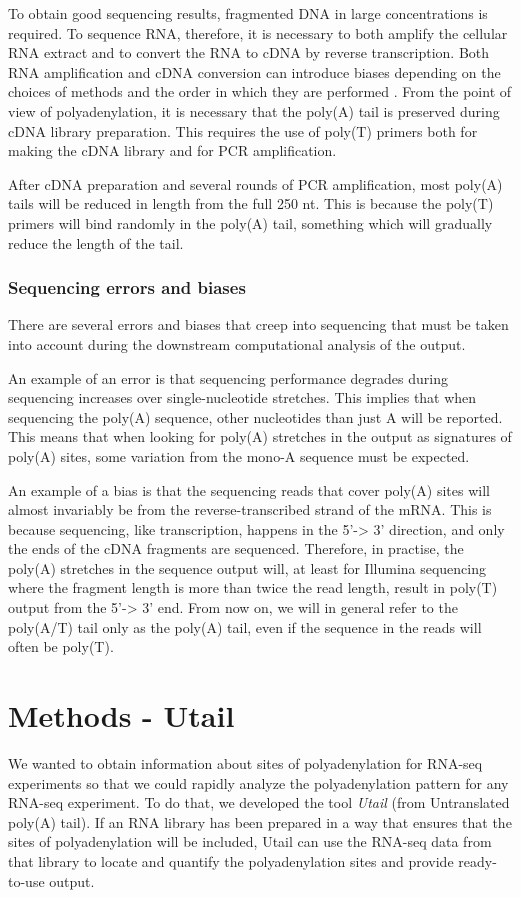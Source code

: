 To obtain good sequencing results, fragmented DNA in large concentrations is
required. To sequence RNA, therefore, it is necessary to both amplify the
cellular RNA extract and to convert the RNA to cDNA by reverse transcription.
Both RNA amplification and cDNA conversion can introduce biases depending on
the choices of methods and the order in which they are performed
\cite{wang_rna-seq:_2009}. From the point of view of polyadenylation, it is
necessary that the poly(A) tail is preserved during cDNA library preparation.
This requires the use of poly(T) primers both for making the cDNA library and
for PCR amplification.

After cDNA preparation and several rounds of PCR amplification, most poly(A)
tails will be reduced in length from the full 250 nt. This is because the
poly(T) primers will bind randomly in the poly(A) tail, something which will
gradually reduce the length of the tail.

\subsubsection{Sequencing errors and biases}
There are several errors and biases that creep into sequencing that must be
taken into account during the downstream computational analysis of the output.

An example of an error is that sequencing performance degrades during
sequencing increases over single-nucleotide stretches. This implies that when
sequencing the poly(A) sequence, other nucleotides than just A will be
reported. This means that when looking for poly(A) stretches in the output as
signatures of poly(A) sites, some variation from the mono-A sequence must be
expected.

An example of a bias is that the sequencing reads that cover poly(A) sites will
almost invariably be from the reverse-transcribed strand of the mRNA. This is
because sequencing, like transcription, happens in the 5'-> 3' direction, and
only the ends of the cDNA fragments are sequenced. Therefore, in practise, the
poly(A) stretches in the sequence output will, at least for Illumina sequencing
where the fragment length is more than twice the read length, result in
poly(T) output from the 5'-> 3' end. From now on, we will in general refer to
the poly(A/T) tail only as the poly(A) tail, even if the sequence in the reads
will often be poly(T).

\section{Methods - Utail}
We wanted to obtain information about sites of polyadenylation for RNA-seq
experiments so that we could rapidly analyze the polyadenylation pattern for
any RNA-seq experiment. To do that, we developed the tool \textit{Utail} (from
Untranslated poly(A) tail). If an RNA library has been prepared in a way that
ensures that the sites of polyadenylation will be included, Utail can use the
RNA-seq data from that library to locate and quantify the polyadenylation sites
and provide ready-to-use output.

